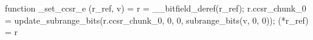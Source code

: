 function _set_ccsr_e (r_ref, v) = {
    r = __bitfield_deref(r_ref);
    r.ccsr_chunk_0 = update_subrange_bits(r.ccsr_chunk_0, 0, 0, subrange_bits(v, 0, 0));
    (*r_ref) = r
}
